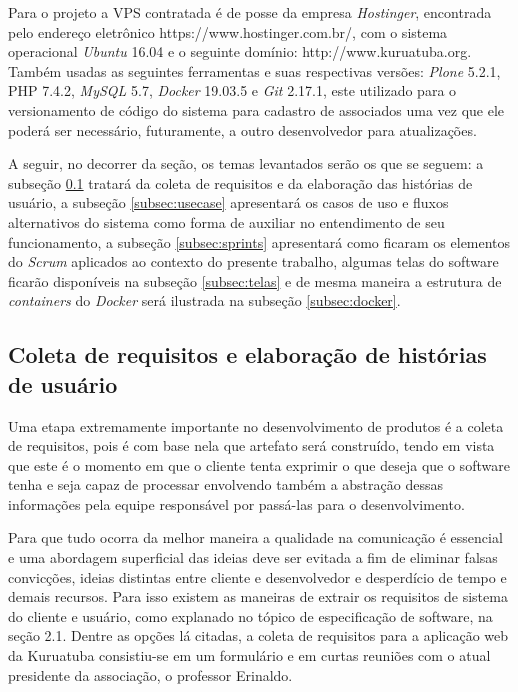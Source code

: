Para o projeto a VPS contratada é de posse da empresa \textit{Hostinger}, encontrada pelo endereço eletrônico \textsf{https://www.hostinger.com.br/}, com o sistema operacional \textit{Ubuntu} 16.04 e o seguinte domínio: \textsf{http://www.kuruatuba.org}. Também usadas as seguintes ferramentas e suas respectivas versões: \textit{Plone} 5.2.1, PHP 7.4.2, \textit{MySQL} 5.7, \textit{Docker} 19.03.5 e \textit{Git} 2.17.1, este utilizado para o versionamento de código do sistema para cadastro de associados uma vez que ele poderá ser necessário, futuramente, a outro desenvolvedor para atualizações. 

A seguir, no decorrer da seção, os temas levantados serão os que se seguem: a subseção \ref{subsec:requisitos} tratará da coleta de requisitos e da elaboração das histórias de usuário, a subseção \ref{subsec:usecase} apresentará os casos de uso e fluxos alternativos do sistema como forma de auxiliar no entendimento de seu funcionamento, a subseção \ref{subsec:sprints} apresentará como ficaram os elementos do \textit{Scrum} aplicados ao contexto do presente trabalho, algumas telas do software ficarão disponíveis na subseção \ref{subsec:telas} e de mesma maneira a estrutura de \textit{containers} do \textit{Docker} será ilustrada na subseção \ref{subsec:docker}.

\hspace{2.5cm}
\subsection{Coleta de requisitos e elaboração de histórias de usuário}
\label{subsec:requisitos}
\hspace{2.5cm}

Uma etapa extremamente importante no desenvolvimento de produtos é a coleta de requisitos, pois é com base nela que artefato será construído, tendo em vista que este é o momento em que o cliente tenta exprimir o que deseja que o software tenha e seja capaz de processar envolvendo também a abstração dessas informações pela equipe responsável por passá-las para o desenvolvimento. 

Para que tudo ocorra da melhor maneira a qualidade na comunicação é essencial e uma abordagem superficial das ideias deve ser evitada a fim de eliminar falsas convicções, ideias distintas entre cliente e desenvolvedor e desperdício de tempo e demais recursos. Para isso existem as maneiras de extrair os requisitos de sistema do cliente e usuário, como explanado no tópico de especificação de software, na seção 2.1. Dentre as opções lá citadas, a coleta de requisitos para a aplicação web da Kuruatuba consistiu-se em um formulário e em curtas reuniões com o atual presidente da associação, o professor Erinaldo. 

